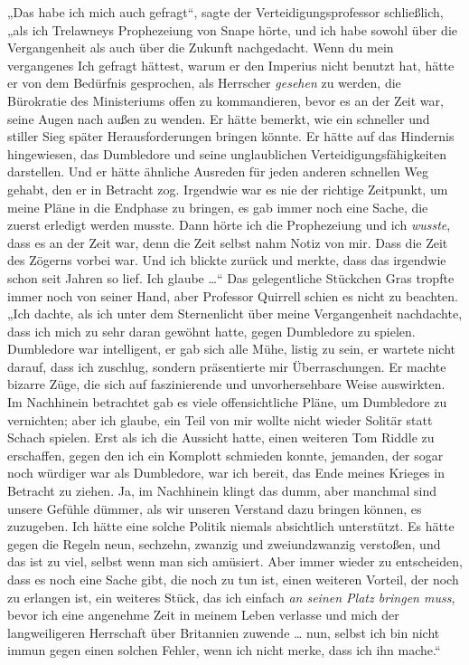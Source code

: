 „Das habe ich mich auch gefragt“, sagte der Verteidigungsprofessor schließlich, „als ich Trelawneys Prophezeiung von Snape hörte, und ich habe sowohl über die Vergangenheit als auch über die Zukunft nachgedacht. Wenn du mein vergangenes Ich gefragt hättest, warum er den Imperius nicht benutzt hat, hätte er von dem Bedürfnis gesprochen, als Herrscher \emph{gesehen} zu werden, die Bürokratie des Ministeriums offen zu kommandieren, bevor es an der Zeit war, seine Augen nach außen zu wenden. Er hätte bemerkt, wie ein schneller und stiller Sieg später Herausforderungen bringen könnte. Er hätte auf das Hindernis hingewiesen, das Dumbledore und seine unglaublichen Verteidigungsfähigkeiten darstellen. Und er hätte ähnliche Ausreden für jeden anderen schnellen Weg gehabt, den er in Betracht zog. Irgendwie war es nie der richtige Zeitpunkt, um meine Pläne in die Endphase zu bringen, es gab immer noch eine Sache, die zuerst erledigt werden musste. Dann hörte ich die Prophezeiung und ich \emph{wusste}, dass es an der Zeit war, denn die Zeit selbst nahm Notiz von mir. Dass die Zeit des Zögerns vorbei war. Und ich blickte zurück und merkte, dass das irgendwie schon seit Jahren so lief. Ich glaube …“
Das gelegentliche Stückchen Gras tropfte immer noch von seiner Hand, aber Professor Quirrell schien es nicht zu beachten.
„Ich dachte, als ich unter dem Sternenlicht über meine Vergangenheit nachdachte, dass ich mich zu sehr daran gewöhnt hatte, gegen Dumbledore zu spielen. Dumbledore war intelligent, er gab sich alle Mühe, listig zu sein, er wartete nicht darauf, dass ich zuschlug, sondern präsentierte mir Überraschungen. Er machte bizarre Züge, die sich auf faszinierende und unvorhersehbare Weise auswirkten. Im Nachhinein betrachtet gab es viele offensichtliche Pläne, um Dumbledore zu vernichten; aber ich glaube, ein Teil von mir wollte nicht wieder Solitär statt Schach spielen. Erst als ich die Aussicht hatte, einen weiteren Tom Riddle zu erschaffen, gegen den ich ein Komplott schmieden konnte, jemanden, der sogar noch würdiger war als Dumbledore, war ich bereit, das Ende meines Krieges in Betracht zu ziehen. Ja, im Nachhinein klingt das dumm, aber manchmal sind unsere Gefühle dümmer, als wir unseren Verstand dazu bringen können, es zuzugeben. Ich hätte eine solche Politik niemals absichtlich unterstützt. Es hätte gegen die Regeln neun, sechzehn, zwanzig und zweiundzwanzig verstoßen, und das ist zu viel, selbst wenn man sich amüsiert. Aber immer wieder zu entscheiden, dass es noch eine Sache gibt, die noch zu tun ist, einen weiteren Vorteil, der noch zu erlangen ist, ein weiteres Stück, das ich einfach \emph{an seinen Platz bringen muss}, bevor ich eine angenehme Zeit in meinem Leben verlasse und mich der langweiligeren Herrschaft über Britannien zuwende … nun, selbst ich bin nicht immun gegen einen solchen Fehler, wenn ich nicht merke, dass ich ihn mache.“

